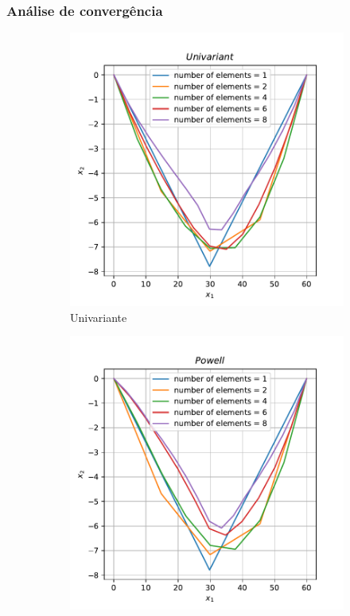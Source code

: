 \documentclass[10pt, a4paper]{article}
\begin{document}
\subsubsection{Análise de convergência}

\begin{figure}[htpb]
  \centering
  \begin{subfigure}[b]{0.32\textwidth}
      \centering
      \includegraphics[width=\textwidth]{images/q2b_Univariant.pdf}
      \caption{Univariante}
      \label{fig:q2b_univariant}
  \end{subfigure}
  \hfill
  \begin{subfigure}[b]{0.32\textwidth}
    \centering
    \includegraphics[width=\textwidth]{images/q2b_Powell.pdf}

\end{subfigure}
\end{figure}
\end{document}
